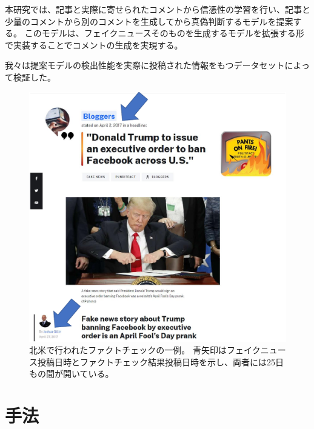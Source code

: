 \documentclass[twocolumn, a4paper, uplatex]{UECIEresume}
\begin{document}
本研究では、記事と実際に寄せられたコメントから信憑性の学習を行い、記事と少量のコメントから別のコメントを生成してから真偽判断するモデルを提案する。
このモデルは、フェイクニュースそのものを生成するモデル\cite{NIPS2019_9106}を拡張する形で実装することでコメントの生成を実現する。

我々は提案モデルの検出性能を実際に投稿された情報をもつデータセットによって検証した。

\begin{figure}[t]
  \centering
  \includegraphics[width=0.7\linewidth]{images/fact-check.pdf}
  \caption{
      北米で行われたファクトチェックの一例。
      青矢印はフェイクニュース投稿日時とファクトチェック結果投稿日時を示し、両者には25日もの間が開いている。
      }
  \label{fig:example}
\end{figure}

\section{手法}


\end{document}

